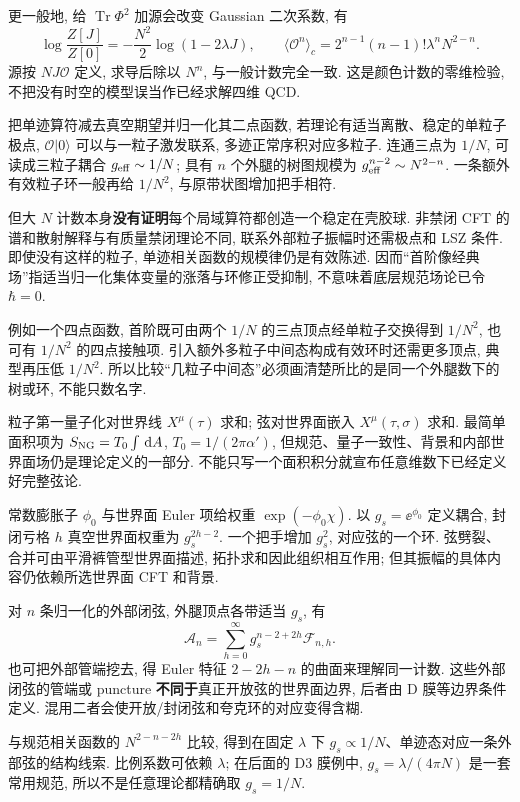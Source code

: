 更一般地, 给 $\operatorname{Tr}\Phi^2$ 加源会改变 Gaussian 二次系数, 有
\[
\log\frac{Z[J]}{Z[0]}=-\frac{N^2}2\log(1-2\lambda J),
\qquad
\langle\mathcal O^n\rangle_c
=2^{n-1}(n-1)!\lambda^nN^{2-n}.
\]
源按 $NJ\mathcal O$ 定义, 求导后除以 $N^n$, 与一般计数完全一致. 这是颜色计数的零维检验, 不把没有时空的模型误当作已经求解四维 QCD.

把单迹算符减去真空期望并归一化其二点函数, 若理论有适当离散、稳定的单粒子极点, $\mathcal O|0\rangle$ 可以与一粒子激发联系, 多迹正常序积对应多粒子. 连通三点为 $1/N$, 可读成三粒子耦合 $g_{\rm eff}\sim1/N$; 具有 $n$ 个外腿的树图规模为 $g_{\rm eff}^{n-2}\sim N^{2-n}$. 一条额外有效粒子环一般再给 $1/N^2$, 与原带状图增加把手相符.

但大 $N$ 计数本身\textbf{没有证明}每个局域算符都创造一个稳定在壳胶球. 非禁闭 CFT 的谱和散射解释与有质量禁闭理论不同, 联系外部粒子振幅时还需极点和 LSZ 条件. 即使没有这样的粒子, 单迹相关函数的规模律仍是有效陈述. 因而“首阶像经典场”指适当归一化集体变量的涨落与环修正受抑制, 不意味着底层规范场论已令 $\hbar=0$.

例如一个四点函数, 首阶既可由两个 $1/N$ 的三点顶点经单粒子交换得到 $1/N^2$, 也可有 $1/N^2$ 的四点接触项. 引入额外多粒子中间态构成有效环时还需更多顶点, 典型再压低 $1/N^2$. 所以比较“几粒子中间态”必须画清楚所比的是同一个外腿数下的树或环, 不能只数名字.

粒子第一量子化对世界线 $X^\mu(\tau)$ 求和; 弦对世界面嵌入 $X^\mu(\tau,\sigma)$ 求和. 最简单面积项为 $S_{\rm NG}=T_0\int\,\mathrm d A$, $T_0=1/(2\pi\alpha')$, 但规范、量子一致性、背景和内部世界面场仍是理论定义的一部分. 不能只写一个面积积分就宣布任意维数下已经定义好完整弦论.

常数膨胀子 $\phi_0$ 与世界面 Euler 项给权重 $\exp(-\phi_0\chi)$. 以 $g_s=\ee^{\phi_0}$ 定义耦合, 封闭亏格 $h$ 真空世界面权重为 $g_s^{2h-2}$. 一个把手增加 $g_s^2$, 对应弦的一个环. 弦劈裂、合并可由平滑裤管型世界面描述, 拓扑求和因此组织相互作用; 但其振幅的具体内容仍依赖所选世界面 CFT 和背景.

对 $n$ 条归一化的外部闭弦, 外腿顶点各带适当 $g_s$, 有
\[
\mathcal A_n=\sum_{h=0}^\infty g_s^{n-2+2h}\mathcal F_{n,h}.
\]
也可把外部管端挖去, 得 Euler 特征 $2-2h-n$ 的曲面来理解同一计数. 这些外部闭弦的管端或 puncture \textbf{不同于}真正开放弦的世界面边界, 后者由 D 膜等边界条件定义. 混用二者会使开放/封闭弦和夸克环的对应变得含糊.

与规范相关函数的 $N^{2-n-2h}$ 比较, 得到在固定 $\lambda$ 下 $g_s\propto1/N$、单迹态对应一条外部弦的结构线索. 比例系数可依赖 $\lambda$; 在后面的 D3 膜例中, $g_s=\lambda/(4\pi N)$ 是一套常用规范, 所以不是任意理论都精确取 $g_s=1/N$.

